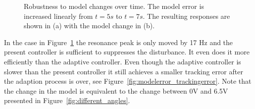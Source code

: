 \begin{figure}[h!]
  \centering %
  \qquad
  \caption{\label{fig:modelerror}Robustness to model changes over time. The model error is increased linearly from $t=5s$ to $t=7s$. The resulting responses are shown in (a) with the model change in (b).}
\end{figure}

In the case in Figure~\ref{fig:modelerror} the resonance peak is only moved by 17 Hz and the present controller is sufficient to suppresses the disturbance. It even does it more efficiently than the adaptive controller. Even though the adaptive controller is slower than the present controller it still achieves a smaller tracking error after the adaption process is over, see Figure~\ref{fig:modelerror_trackingerror}. Note that the change in the model is equivalent to the change between 0V and 6.5V presented in Figure~\ref{fig:different_angles}.


